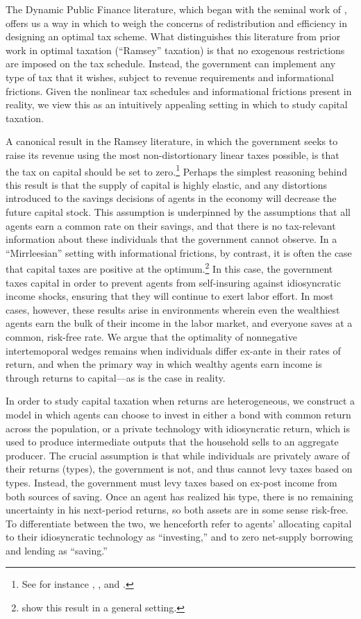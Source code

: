 \documentclass[11pt]{article}
\begin{document}
The Dynamic Public Finance literature, which began with the seminal work of \cite{mirrlees1971exploration}, offers us a way in which to weigh the concerns of redistribution and efficiency in designing an optimal tax scheme. What distinguishes this literature from prior work in optimal taxation (``Ramsey'' taxation) is that no exogenous restrictions are imposed on the tax schedule. Instead, the government can implement any type of tax that it wishes, subject to revenue requirements and informational frictions. Given the nonlinear tax schedules and informational frictions present in reality, we view this as an intuitively appealing setting in which to study capital taxation. 

A canonical result in the Ramsey literature, in which the government seeks to raise its revenue using the most non-distortionary linear taxes possible, is that the tax on capital should be set to zero.\footnote{See for instance \cite{atkinson1976design}, \cite{chamley1986optimal}, and \cite{judd1982redistributive}.} Perhaps the simplest reasoning behind this result is that the supply of capital is highly elastic, and any distortions introduced to the savings decisions of agents in the economy will decrease the future capital stock. This assumption is underpinned by the assumptions that all agents earn a common rate on their savings, and that there is no tax-relevant information about these individuals that the government cannot observe. In a ``Mirrleesian'' setting with informational frictions, by contrast, it is often the case that capital taxes are positive at the optimum.\footnote{\cite{golosov2003optimal} show this result in a general setting.} In this case, the government taxes capital in order to prevent agents from self-insuring against idiosyncratic income shocks, ensuring that they will continue to exert labor effort. In most cases, however, these results arise in environments wherein even the wealthiest agents earn the bulk of their income in the labor market, and everyone saves at a common, risk-free rate. We argue that the optimality of nonnegative intertemoporal wedges remains when individuals differ ex-ante in their rates of return, and when the primary way in which wealthy agents earn income is through returns to capital---as is the case in reality. 

In order to study capital taxation when returns are heterogeneous, we construct a model in which agents can choose to invest in either a bond with common return across the population, or a private technology with idiosyncratic return, which is used to produce intermediate outputs that the household sells to an aggregate producer. The crucial assumption is that while individuals are privately aware of their returns (types), the government is not, and thus cannot levy taxes based on types. Instead, the government must levy taxes based on ex-post income from both sources of saving. Once an agent has realized his type, there is no remaining uncertainty in his next-period returns, so both assets are in some sense risk-free. To differentiate between the two, we henceforth refer to agents' allocating capital to their idiosyncratic technology as ``investing,'' and to zero net-supply borrowing and lending as ``saving.''
\end{document}
